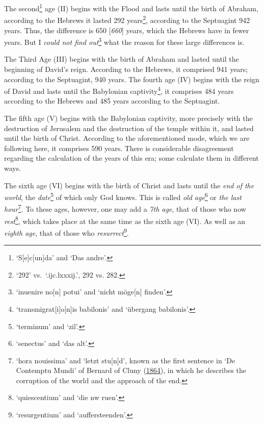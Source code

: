 \documentclass[
]{article}
\begin{document}
The second\footnote{`S{[}e{]}c{[}un{]}da' and `Das andre'.} age (II)
begins with the Flood and lasts until the birth of Abraham, according to
the Hebrews it lasted 292 years\footnote{`292' vs.~`.ijc.lxxxij.', 292
  vs. 282.}, according to the Septuagint 942 years. Thus, the difference
is 650 {[}\emph{660}{]} years, which the Hebrews have in fewer years.
But I \emph{could not find out}\footnote{`inuenire no{[}n{]} potui' and
  `nicht möge{[}n{]} finden'.} what the reason for these large
differences is.

The Third Age (III) begins with the birth of Abraham and lasted until
the beginning of David's reign. According to the Hebrews, it comprised
941 years; according to the Septuagint, 940 years. The fourth age (IV)
begins with the reign of David and lasts until the Babylonian
captivity\footnote{`transmigrat{[}i{]}o{[}n{]}is babilonis' and
  `übergang babilonis'.}, it comprises 484 years according to the
Hebrews and 485 years according to the Septuagint.

The fifth age (V) begins with the Babylonian captivity, more precisely
with the destruction of Jerusalem and the destruction of the temple
within it, and lasted until the birth of Christ. According to the
aforementioned mode, which we are following here, it comprises 590
years. There is considerable disagreement regarding the calculation of
the years of this era; some calculate them in different ways.

The sixth age (VI) begins with the birth of Christ and lasts until the
\emph{end of the world}, the \emph{date}\footnote{`terminum' and `zil'.}
of which only God knows. This is called \emph{old age}\footnote{`senectus'
  and `das alt'.} or \emph{the last hour}\footnote{`hora nouissima' and
  `letzt stu{[}n{]}d', known as the first sentence in `De Contemptu
  Mundi' of Bernard of Cluny
  (\href{https://books.google.com/books?id=pAM_lfiF7EUC}{1864}), in
  which he describes the corruption of the world and the approach of the
  end.}. To these ages, however, one may add a \emph{7th age}, that of
those who now \emph{rest}\footnote{`quiescentium' and `die nw ruen'.},
which takes place at the same time as the sixth age (VI). As well as an
\emph{eighth age}, that of those who \emph{resurrect}\footnote{`resurgentium'
  and `auffersteenden'.}.
\end{document}
